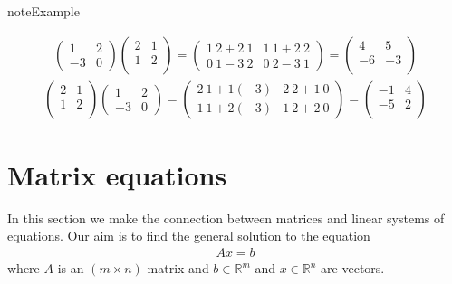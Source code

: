 \documentclass[letterpaper,10pt,english]{jupyterBook}
\begin{document}
\begin{sphinxadmonition}{note}{Example}

\sphinxAtStartPar
{}
\begin{equation*}
\begin{split}\left(\begin{array}{cc}1 & 2 \\-3 & 0 \end{array}\right) \left(\begin{array}{cc}2 & 1 \\1 & 2 \\\end{array}\right)=\left(\begin{array}{cc}1\ 2+2\ 1 & 1\ 1+2\ 2 \\0\ 1-3\ 2 & 0\ 2-3\ 1\end{array}\right)=\left(\begin{array}{cc}4 & 5 \\-6 & -3 \\\end{array}\right)\end{split}
\end{equation*}\begin{equation*}
\begin{split}\left(\begin{array}{cc}2 & 1 \\1 & 2 \\\end{array}\right) \left(\begin{array}{cc}1 & 2 \\-3 & 0 \end{array}\right)=\left(\begin{array}{cc}2\ 1+1 (-3) & 2\ 2+1\ 0 \\1\ 1+2 (-3) & 1\ 2+2\ 0 \end{array}\right)=\left(\begin{array}{cc}-1 & 4 \\-5 & 2 \\\end{array}\right)\end{split}
\end{equation*}\end{sphinxadmonition}


\section{Matrix equations}
\label{\detokenize{LinearAlgebra/linear_systems_matrices/matrices:matrix-equations}}
\sphinxAtStartPar
In this section we make the connection between matrices and linear systems of equations. Our aim is to find the general solution to the equation
\begin{equation*}
\begin{split}Ax = b\end{split}
\end{equation*}
\sphinxAtStartPar
where \(A\) is an \((m \times n)\) matrix and \(b \in \mathbb{R}^m\) and \(x \in \mathbb{R}^n\) are vectors.
\end{document}
